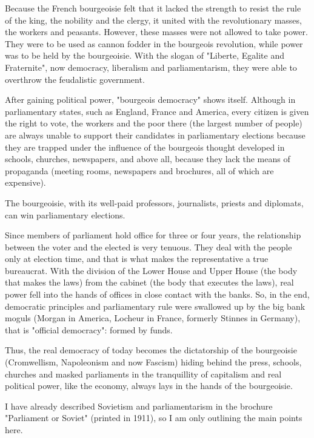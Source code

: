 Because the French bourgeoisie felt that it lacked the strength to resist the rule of the king, the nobility and the 
clergy, it united with the revolutionary masses, the workers and peasants. However, these masses were not allowed to 
take power. They were to be used as cannon fodder in the bourgeois revolution, while power was to be held by the 
bourgeoisie. With the slogan of "Liberte, Egalite and Fraternite", now democracy, liberalism and parliamentarism, 
they were able to overthrow the feudalistic government.\nline

After gaining political power, "bourgeois democracy" shows itself. Although in parliamentary states, 
such as England, France and America, every citizen is given the right to vote, the workers and the poor 
there (the largest number of people) are always unable to support their candidates in parliamentary 
elections because they are trapped under the influence of the bourgeois thought developed in schools, 
churches, newspapers, and above all, because they lack the means of propaganda (meeting rooms, newspapers and brochures, 
all of which are expensive).\nline

The bourgeoisie, with its well-paid professors, journalists, priests and diplomats, can win parliamentary elections.\nline

Since members of parliament hold office for three or four years, the relationship between the voter and the elected is 
very tenuous. They deal with the people only at election time, and that is what makes the representative a true bureaucrat. 
With the division of the Lower House and Upper House (the body that makes the laws) from the cabinet 
(the body that executes the laws), real power fell into the hands of offices in close contact with the banks. So, in the 
end, democratic principles and parliamentary rule were swallowed up by the big bank moguls (Morgan in America, Locheur 
in France, formerly Stinnes in Germany), that is "official democracy": formed by funds.\nline

Thus, the real democracy of today becomes the dictatorship of the bourgeoisie (Cromwellism, Napoleonism and now Fascism) 
hiding behind the press, schools, churches and masked parliaments in the tranquillity of capitalism and real political power, 
like the economy, always lays in the hands of the bourgeoisie.\nline

I have already described Sovietism and parliamentarism in the brochure "Parliament or Soviet" (printed in 1911), so I am 
only outlining the main points here.\nline

